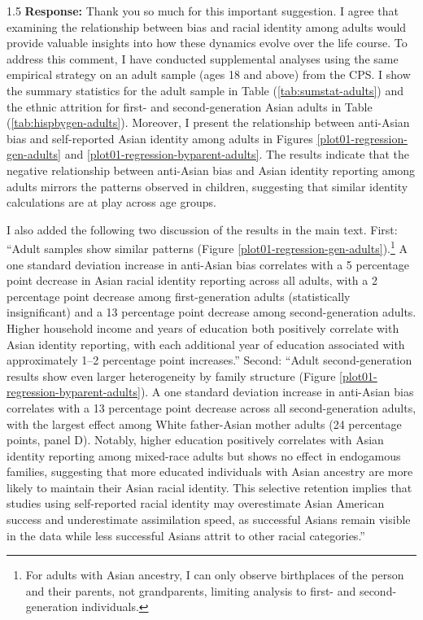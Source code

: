\documentclass[12pt,english]{article}
\newcommand{\rrxspc}{1.5}
\begin{document}
\begin{refsection}
    \begin{spacing}{\rrxspc}
        \textbf{Response:} Thank you so much for this important suggestion. I agree that examining the relationship between bias and racial identity among adults would provide valuable insights into how these dynamics evolve over the life course. To address this comment, I have conducted supplemental analyses using the same empirical strategy on an adult sample (ages 18 and above) from the CPS. I show the summary statistics for the adult sample in Table (\ref{tab:sumstat-adults}) and the ethnic attrition for first- and second-generation Asian adults in Table (\ref{tab:hispbygen-adults}). Moreover, I present the relationship between anti-Asian bias and self-reported Asian identity among adults in Figures \ref{plot01-regression-gen-adults} and \ref{plot01-regression-byparent-adults}. The results indicate that the negative relationship between anti-Asian bias and Asian identity reporting among adults mirrors the patterns observed in children, suggesting that similar identity calculations are at play across age groups.

        I also added the following two discussion of the results in the main text. First: ``Adult samples show similar patterns (Figure \ref{plot01-regression-gen-adults}).\footnote{For adults with Asian ancestry, I can only observe birthplaces of the person and their parents, not grandparents, limiting analysis to first- and second-generation individuals.} A one standard deviation increase in anti-Asian bias correlates with a 5 percentage point decrease in Asian racial identity reporting across all adults, with a 2 percentage point decrease among first-generation adults (statistically insignificant) and a 13 percentage point decrease among second-generation adults. Higher household income and years of education both positively correlate with Asian identity reporting, with each additional year of education associated with approximately 1--2 percentage point increases.'' Second: ``Adult second-generation results show even larger heterogeneity by family structure (Figure \ref{plot01-regression-byparent-adults}). A one standard deviation increase in anti-Asian bias correlates with a 13 percentage point decrease across all second-generation adults, with the largest effect among White father-Asian mother adults (24 percentage points, panel D). Notably, higher education positively correlates with Asian identity reporting among mixed-race adults but shows no effect in endogamous families, suggesting that more educated individuals with Asian ancestry are more likely to maintain their Asian racial identity. This selective retention implies that studies using self-reported racial identity may overestimate Asian American success and underestimate assimilation speed, as successful Asians remain visible in the data while less successful Asians attrit to other racial categories.''
    \end{spacing}


\end{refsection}
\end{document}
